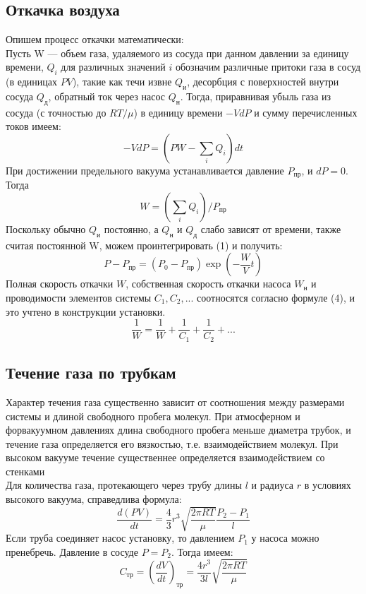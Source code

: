 \documentclass[a4paper, 12pt]{article}%
\begin{document}
	\subsection{Откачка воздуха}
	Опишем процесс откачки математически: \\
	Пусть W --- объем газа, удаляемого из сосуда при данном давлении за единицу времени, $Q_i$ для различных значений $i$ обозначим различные притоки газа в сосуд (в единицах $PV$), такие как течи извне $Q_\text{и}$, десорбция с поверхностей внутри сосуда $Q_\text{д}$, обратный ток через насос $Q_\text{н}$. Тогда, приравнивая убыль газа из сосуда (с точностью до $RT/\mu$) в единицу времени $-VdP$ и сумму перечисленных токов имеем:
\begin{equation}
	-VdP = (PW - \sum_i Q_i)dt
\end{equation}
При достижении предельного вакуума устанавливается давление $P_{\text{пр}}$, и $dP = 0$. Тогда
\begin{equation}
	W = ( \sum_i Q_i )/P_{\text{пр}}
\end{equation}
Поскольку обычно $Q_\text{и}$ постоянно, а $Q_\text{н}$ и $Q_\text{д}$ слабо зависят от времени, также считая постоянной W, можем проинтегрировать (1) и получить:
\begin{equation}
	P - P_{\text{пр}} = (P_0 - P_{\text{пр}})\exp(-\frac{W}{V}t)
\end{equation}
Полная скорость откачки $W$, собственная скорость откачки насоса $W_{\text{н}}$ и проводимости элементов системы $C_1, C_2,...$ соотносятся согласно формуле (4), и это учтено в конструкции установки.
\begin{equation}
	\frac{1}{W} = \frac{1}{W} + \frac{1}{C_1} + \frac{1}{C_2} + ...
\end{equation}
\subsection{Течение газа по трубкам}
Характер течения газа существенно зависит от соотношения между размерами системы и длиной свободного пробега молекул. При атмосферном и форвакуумном давлениях  длина свободного пробега меньше диаметра трубок, и течение газа определяется его вязкостью, т.е. взаимодействием молекул. При высоком вакууме течение существеннее определяется взаимодействием со стенками \\
Для количества газа, протекающего через трубу длины $l$ и радиуса $r$ в условиях высокого вакуума, справедлива формула:
\begin{equation}
	\frac{d(PV)}{dt} = \frac{4}{3}r^3\sqrt{\frac{2\pi RT}{\mu}}\frac{P_2 - P_1}{l}
\end{equation}
Если труба соединяет насос установку, то давлением $P_1$ у насоса можно пренебречь. Давление в сосуде $P = P_2$. Тогда имеем:
\begin{equation}
	C_\text{тр} = \left(\frac{dV}{dt}\right)_\text{тр} = \frac{4r^3}{3l}\sqrt{\frac{2\pi RT}{\mu}}
\end{equation}
\end{document}
